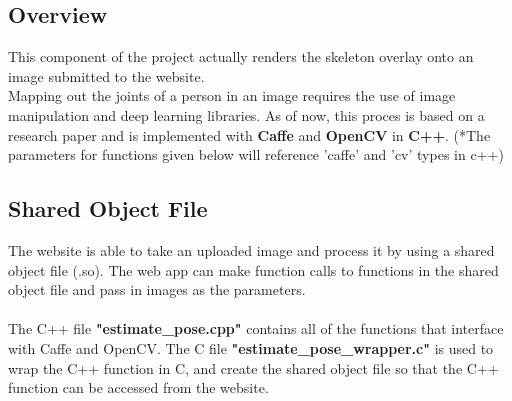 \documentclass{scrreprt}
\begin{document}
\subsection{Overview}

This component of the project actually renders the skeleton overlay onto an image submitted to the website.
\\
Mapping out the joints of a person in an image requires the use of image manipulation and deep learning libraries. As of now, this proces is based on a research paper and is implemented with \textbf{Caffe} and \textbf{OpenCV} in \textbf{C++}. (*The parameters for functions given below will reference 'caffe' and 'cv' types in c++)


\subsection{Shared Object File}

The website is able to take an uploaded image and process it by using a shared object file (.so). The web app can make function calls to functions in the shared object file and pass in images as the parameters.
\\\\
The C++ file \textbf{"estimate\_pose.cpp"} contains all of the functions that interface with Caffe and OpenCV. The C file \textbf{"estimate\_pose\_wrapper.c"} is used to wrap the C++ function in C, and create the shared object file so that the C++ function can be accessed from the website.
\end{document}
